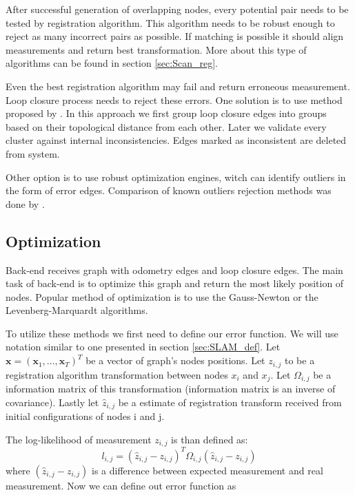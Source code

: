 After successful generation of overlapping nodes, every potential pair needs to be tested by registration algorithm. This algorithm needs to be robust enough to reject as many incorrect pairs as possible. If matching is possible it should align measurements and return best transformation. More about this type of algorithms can be found in section \ref{sec:Scan_reg}.

Even the best registration algorithm may fail and return erroneous measurement. Loop closure process needs to reject these errors. One solution is to use method proposed by \cite{Olson2009Loop}. In this approach we first group loop closure edges into groups based on their topological distance from each other. Later we validate every cluster against internal inconsistencies. Edges marked as inconsistent are deleted from system. 

Other option is to use robust optimization engines, witch can identify outliers in the form of error edges. Comparison of known outliers rejection methods was done by \cite{RobustOpt}. 


\newpage

\subsection{Optimization}
Back-end receives graph with odometry edges and loop closure edges. The main task of back-end is to optimize this graph and return the most likely position of nodes. Popular method of optimization is to use the Gauss-Newton or the Levenberg-Marquardt algorithms. 

To utilize these methods we first need to define our error function. We will use notation similar to one presented in section \ref{sec:SLAM_def}. Let $\textbf{x} = (\textbf{x}_{1},...,\textbf{x}_{T})^{T} $ be a vector of graph's nodes positions. Let $z_{i,j}$ to be a registration algorithm transformation between nodes $x_{i}$ and $x_{j}$. Let $\Omega_{i,j}$ be a information matrix of this transformation (information matrix is an inverse of covariance). Lastly let $\hat{z}_{i,j}$ be a estimate of registration transform received from initial configurations of nodes i and j.

The log-likelihood of measurement $z_{i,j}$ is than defined as:
\begin{equation}
l_{i,j} = (\hat{z}_{i,j} - z_{i,j})^{T} \Omega_{i,j} (\hat{z}_{i,j} - z_{i,j}) 
\end{equation}  
where $(\hat{z}_{i,j} - z_{i,j})$ is a difference between expected measurement and real measurement. Now we can define out error function as

